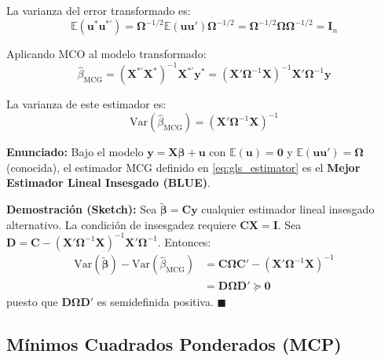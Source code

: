 \documentclass[12pt,a4paper]{report}
\theoremstyle{definition}
\theoremstyle{remark}
\newcommand{\E}{\mathbb{E}}
\newcommand{\Var}{\mathrm{Var}}
\newcommand{\betahat}{\hat{\beta}}
\newcommand{\GLS}{\text{MCG}}
\begin{document}
La varianza del error transformado es:
\begin{equation}
  \E(\mathbf{u}^*\mathbf{u}^{*'}) = \boldsymbol{\Omega}^{-1/2}\E(\mathbf{u}\mathbf{u}')\boldsymbol{\Omega}^{-1/2} = \boldsymbol{\Omega}^{-1/2}\boldsymbol{\Omega}\boldsymbol{\Omega}^{-1/2} = \mathbf{I}_n
  \label{eq:var_u_star}
\end{equation}

Aplicando MCO al modelo transformado:
\begin{equation}
  \boxed{
  \betahat_{\GLS} = (\mathbf{X}^{*'}\mathbf{X}^*)^{-1}\mathbf{X}^{*'}\mathbf{y}^* = (\mathbf{X}'\boldsymbol{\Omega}^{-1}\mathbf{X})^{-1}\mathbf{X}'\boldsymbol{\Omega}^{-1}\mathbf{y}
  }
  \label{eq:gls_estimator}
\end{equation}

La varianza de este estimador es:
\begin{equation}
  \Var(\betahat_{\GLS}) = (\mathbf{X}'\boldsymbol{\Omega}^{-1}\mathbf{X})^{-1}
  \label{eq:var_gls}
\end{equation}

\begin{tcolorbox}[teoremastyle, title={Teorema de Aitken (Gauss-Markov Generalizado)}]
  \textbf{Enunciado:} Bajo el modelo $\mathbf{y} = \mathbf{X}\boldsymbol{\beta} + \mathbf{u}$ con $\E(\mathbf{u}) = \mathbf{0}$ y $\E(\mathbf{u}\mathbf{u}') = \boldsymbol{\Omega}$ (conocida), el estimador MCG definido en \eqref{eq:gls_estimator} es el \textbf{Mejor Estimador Lineal Insesgado (BLUE)}.

  \textbf{Demostración (Sketch):} Sea $\tilde{\boldsymbol{\beta}} = \mathbf{C}\mathbf{y}$ cualquier estimador lineal insesgado alternativo. La condición de insesgadez requiere $\mathbf{C}\mathbf{X} = \mathbf{I}$. Sea $\mathbf{D} = \mathbf{C} - (\mathbf{X}'\boldsymbol{\Omega}^{-1}\mathbf{X})^{-1}\mathbf{X}'\boldsymbol{\Omega}^{-1}$. Entonces:
  \begin{align*}
    \Var(\tilde{\boldsymbol{\beta}}) - \Var(\betahat_{\GLS})
    &= \mathbf{C}\boldsymbol{\Omega}\mathbf{C}' - (\mathbf{X}'\boldsymbol{\Omega}^{-1}\mathbf{X})^{-1}\\
    &= \mathbf{D}\boldsymbol{\Omega}\mathbf{D}' \succeq \mathbf{0}
  \end{align*}
  puesto que $\mathbf{D}\boldsymbol{\Omega}\mathbf{D}'$ es semidefinida positiva. $\blacksquare$
\end{tcolorbox}

\subsection{Mínimos Cuadrados Ponderados (MCP)}
\end{document}
